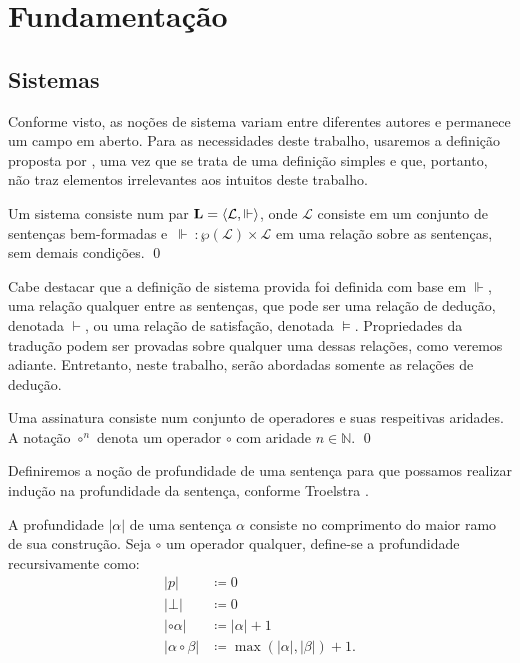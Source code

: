 \chapter{Fundamentação}

\section{Sistemas}

Conforme visto, as noções de sistema variam entre diferentes autores e permanece um campo em aberto. Para as necessidades deste trabalho, usaremos a definição proposta por \cite{Beziau}, uma vez que se trata de uma definição simples e que, portanto, não traz elementos irrelevantes aos intuitos deste trabalho.

\begin{definition}[Sistema]
    Um sistema consiste num par $\mathbf{L} = \langle\mathcal{L}, \Vdash\rangle$, onde $\mathcal{L}$ consiste em um conjunto de sentenças bem-formadas e $\, \Vdash \: : \wp(\mathcal{L}) \times \mathcal{L} $ em uma relação sobre as sentenças, sem demais condições.
    \qed
\end{definition}

Cabe destacar que a definição de sistema provida foi definida com base em $\Vdash$, uma relação qualquer entre as sentenças, que pode ser uma relação de dedução, denotada $\vdash$, ou uma relação de satisfação, denotada $\vDash$. Propriedades da tradução podem ser provadas sobre qualquer uma dessas relações, como veremos adiante. Entretanto, neste trabalho, serão abordadas somente as relações de dedução.

\begin{definition}[Assinatura]
    Uma assinatura consiste num conjunto de operadores e suas respeitivas aridades. A notação $\circ^n$ denota um operador $\circ$ com aridade $n \in \mathbb{N}$.
    \qed
\end{definition}

Definiremos a noção de profundidade de uma sentença para que possamos realizar indução na profundidade da sentença, conforme Troelstra \cite{Troelstra}.

\begin{definition}[Profundidade]
    A profundidade $|\alpha|$ de uma sentença $\alpha$ consiste no comprimento do maior ramo de sua construção. Seja $\circ$ um operador qualquer, define-se a profundidade recursivamente como:
    \begin{align*}
        |p|                  & \coloneqq 0                           \\
        |\bot|               & \coloneqq 0                           \\
        |\circ \alpha|       & \coloneqq |\alpha| + 1                \\
        |\alpha \circ \beta| & \coloneqq \max(|\alpha|, |\beta|) + 1.
        \tag*{\qed} 
    \end{align*}
\end{definition}

